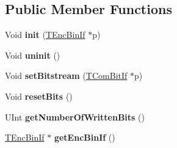 \subsection*{Public Member Functions}
\begin{DoxyCompactItemize}
\item 
\mbox{\label{class_t_enc_sbac_ad7e3cdb3cbb7d3f7ea8c907dd448c69a}} 
Void {\bfseries init} (\hyperlink{class_t_enc_bin_if}{T\+Enc\+Bin\+If} $\ast$p)
\item 
\mbox{\label{class_t_enc_sbac_ab99f18ec4428c53d98c27f5ee5081010}} 
Void {\bfseries uninit} ()
\item 
\mbox{\label{class_t_enc_sbac_a6f21d36278c8150fe251fd15c1cc7512}} 
Void {\bfseries set\+Bitstream} (\hyperlink{class_t_com_bit_if}{T\+Com\+Bit\+If} $\ast$p)
\item 
\mbox{\label{class_t_enc_sbac_a8a120945bddbbb7d04ef971d60dcb0af}} 
Void {\bfseries reset\+Bits} ()
\item 
\mbox{\label{class_t_enc_sbac_ae04adc1bae2cf34635f8beffa085db9c}} 
U\+Int {\bfseries get\+Number\+Of\+Written\+Bits} ()
\item 
\mbox{\label{class_t_enc_sbac_abf13a217b12c8428383df6e6a4431364}} 
\hyperlink{class_t_enc_bin_if}{T\+Enc\+Bin\+If} $\ast$ {\bfseries get\+Enc\+Bin\+If} ()
\end{DoxyCompactItemize}
